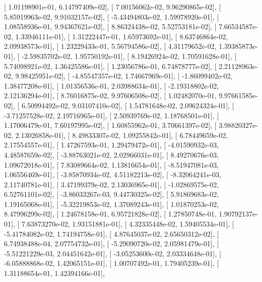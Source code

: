 \documentclass{article}
\begin{document}
       [  1.01198901e-01,   6.14797409e-02],
       [  7.00156062e-02,   9.96290865e-02],
       [  5.85919963e-02,   9.91032157e-02],
       [ -5.43494803e-02,   1.59978920e-01],
       [  1.08558936e-01,   9.94367621e-02],
       [  8.86324438e-02,   5.52753181e-02],
       [  7.66534587e-02,   1.33946111e-01],
       [  1.31222447e-01,   1.65973692e-01],
       [  8.63746864e-02,   2.09938573e-01],
       [  1.23229433e-01,   5.56794586e-02],
       [  4.31179652e-02,   1.39385873e-01],
       [ -2.59835702e-02,   1.95750192e-01],
       [  8.19426924e-02,   1.70591628e-01],
       [  5.74098921e-02,   1.36425586e-01],
       [  1.23056786e-01,   6.74878777e-02],
       [  2.21128963e-02,   9.98425951e-02],
       [ -4.85547357e-02,   1.74667969e-01],
       [ -1.86099402e-02,   1.38477208e-01],
       [  1.01356536e-01,   2.03988634e-01],
       [ -2.19318802e-02,   2.12136294e-01],
       [  8.76016875e-02,   9.97606508e-02],
       [  1.02482070e-01,   9.97661585e-02],
       [  6.50994492e-02,   9.03107410e-02],
       [  1.54781648e-02,   2.09624324e-01],
       [ -3.71257528e-02,   2.19716965e-01],
       [  2.50939769e-02,   1.18768501e-01],
       [  1.17006479e-01,   7.60197995e-02],
       [  1.60855962e-01,   3.70661397e-02],
       [  3.98820327e-02,   2.13026858e-01],
       [  8.49833307e-02,   1.09255842e-01],
       [  6.78449659e-02,   2.17554557e-01],
       [  1.47267593e-01,   1.29479472e-01],
       [ -4.01590932e-03,   4.48587659e-02],
       [ -3.88763021e-02,   2.02966031e-01],
       [  8.49270676e-03,   1.09672018e-01],
       [  7.83089664e-02,   1.13816654e-01],
       [ -8.51947081e-03,   1.06556469e-01],
       [ -3.85870934e-02,   4.51182213e-02],
       [ -8.32064241e-03,   2.11740781e-01],
       [  3.47199379e-02,   2.13036965e-01],
       [ -1.02869575e-02,   6.52761101e-02],
       [ -3.86033267e-03,   9.44730325e-02],
       [  5.91869683e-02,   1.19165068e-01],
       [ -5.32219853e-02,   1.37089243e-01],
       [  1.01870253e-02,   8.47996299e-02],
       [  1.24678158e-01,   6.95721828e-02],
       [  1.27850748e-01,   1.90792137e-01],
       [  7.63873270e-02,   1.93151881e-01],
       [  4.32335448e-02,   1.59405534e-01],
       [ -5.41784082e-02,   1.74194758e-01],
       [  4.87645037e-02,   2.65650312e-02],
       [  6.74938488e-04,   2.07754732e-01],
       [ -5.29090720e-02,   2.05981479e-01],
       [ -5.51221229e-03,   2.04451642e-01],
       [ -3.05253600e-02,   2.03334648e-01],
       [ -6.05888868e-02,   1.42065151e-01],
       [  1.00707492e-01,   1.79405239e-01],
       [  1.31188654e-01,   1.42394166e-01],
\end{document}
